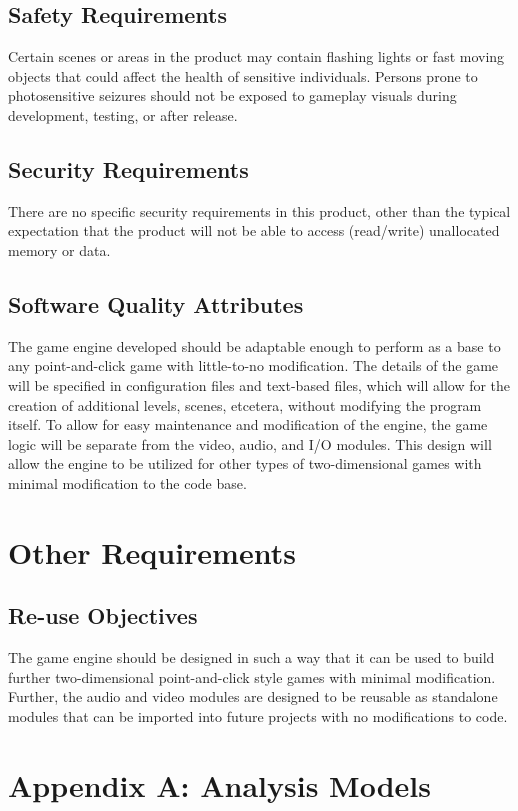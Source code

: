 \documentclass{article}
\begin{document}
	\subsection{Safety Requirements}
		Certain scenes or areas in the product may contain flashing lights or fast moving objects that could affect the health of sensitive individuals. Persons prone to photosensitive seizures should not be exposed to gameplay visuals during development, testing, or after release. 
	\subsection{Security Requirements}
		There are no specific security requirements in this product, other than the typical expectation that the product will not be able to access (read/write) unallocated memory or data. 
	\subsection{Software Quality Attributes}
		The game engine developed should be adaptable enough to perform as a base to any point-and-click game with little-to-no modification. The details of the game will be specified in configuration files and text-based files, which will allow for the creation of additional levels, scenes, etcetera, without modifying the program itself. To allow for easy maintenance and modification of the engine, the game logic will be separate from the video, audio, and I/O modules. This design will allow the engine to be utilized for other types of two-dimensional games with minimal modification to the code base. 
\section{Other Requirements}
	\subsection{Re-use Objectives}
		The game engine should be designed in such a way that it can be used to build further two-dimensional point-and-click style games with minimal modification. Further, the audio and video modules are designed to be reusable as standalone modules that can be imported into future projects with no modifications to code.
\section{Appendix A: Analysis Models}
\end{document}
